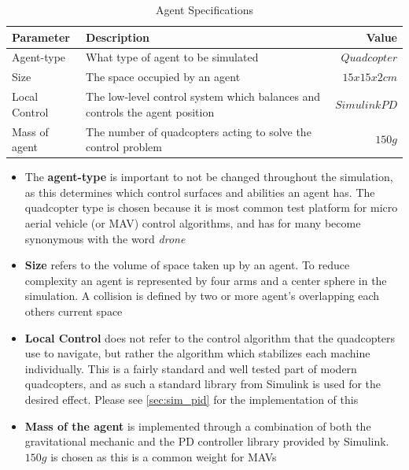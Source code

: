 \begin{table}[H]
\centering
\begin{tabularx}{1\textwidth}{l@{ }Xr}
\toprule
\textbf{Parameter}   & \textbf{Description}                                                        & \textbf{Value}  \\ \midrule
Agent-type       	 & What type of agent to be simulated                                          & ${Quadcopter}$  \\
Size       		 	 & The space occupied by an agent                                    		   & ${15x15x2cm}$   \\
Local Control        & The low-level control system which balances and controls the agent position & ${Simulink PD}$ \\
Mass of agent     	 & The number of quadcopters acting to solve the control problem               & ${150g}$        \\
\bottomrule
\end{tabularx}
\caption{Agent Specifications}
\label{tab:agent_specs}
\end{table}

\begin{itemize}
\item{The \textbf{agent-type} is important to not be changed throughout the simulation, as this determines which control surfaces and abilities an agent has. The quadcopter type is chosen because it is most common test platform for micro aerial vehicle (or MAV) control algorithms, and has for many become synonymous with the word \textit{drone} \cite{augugliaro_flight_2014}}
\item{\textbf{Size} refers to the volume of space taken up by an agent. To reduce complexity an agent is represented by four arms and a center sphere in the simulation. A collision is defined by two or more agent's overlapping each others current space}	
\item{\textbf{Local Control} does not refer to the control algorithm that the quadcopters use to navigate, but rather the algorithm which stabilizes each machine individually. This is a fairly standard and well tested part of modern quadcopters, and as such a standard library from Simulink is used for the desired effect. Please see \ref{sec:sim_pid} for the implementation of this}	
\item{\textbf{Mass of the agent} is implemented through a combination of both the gravitational mechanic and the PD controller library provided by Simulink. ${150g}$ is chosen as this is a common weight for MAVs}
\end{itemize}

